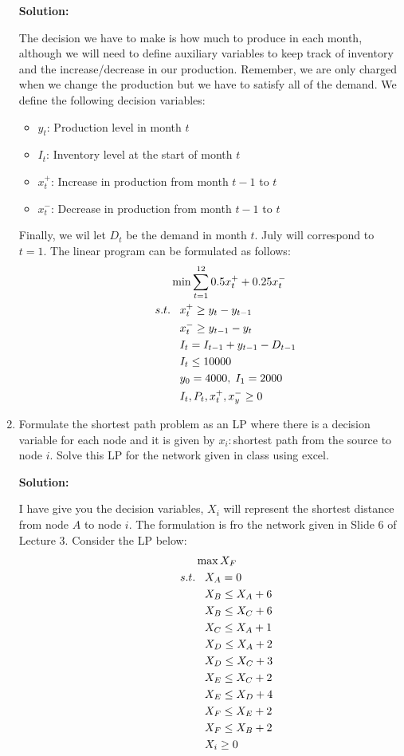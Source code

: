 \documentclass{article}[11 pt]    %
\begin{document}
\begin{enumerate}
\noindent \textbf{Solution:}

The decision we have to make is how much to produce in each month, although we will need to define auxiliary variables to keep track of inventory and the increase/decrease in our production.  Remember, we are only charged when we change the production but we have to satisfy all of the demand. We define the following decision variables:
\begin{itemize}
\item $y_t$: Production level in month $t$
\item $I_t$: Inventory level at the start of month $t$
\item $x^+_t$: Increase in production from month $t-1$ to $t$
\item $x^-_t$: Decrease in production from month $t-1$ to $t$ 
\end{itemize}
Finally, we wil let $D_t$ be the demand in month $t$. July will correspond to $t=1$.  The linear program can be formulated as follows:
\begin{align*}
\hspace{1.5cm}& \min \sum_{t=1}^{12} 0.5x^+_t + 0.25x^-_t \\
s.t. &\;\;\; x^+_t \geq y_t - y _{t-1}  \\
&\;\;\; x^-_t \geq y_{t-1} - y _{t}\\
&\;\;\; I_t=I_{t-1} + y_{t-1} - D_{t-1} \\
&\;\;\; I_t\leq 10000 \\
&\;\;\; y_0=4000, \; I_1=2000 \\
&\;\;\; I_t, P_t, x^+_t,x^-_y \geq 0
\end{align*}


\item Formulate the shortest path problem as an LP where there is a decision variable for each node and it is given by $x_i:$shortest path from the source to node $i$.  Solve this LP for the network given in class using excel. 

\noindent \textbf{Solution:}

I have give you the decision variables, $X_i$ will represent the shortest distance from node $A$ to node $i$.  The formulation is fro the network given in Slide 6 of Lecture 3. Consider the LP below:
\begin{align*}
\hspace{1.5cm}& \max X_F \\
s.t. &\;\;\; X_A =0  \\
&\;\;\; X_B \leq X_A +6\\
&\;\;\; X_B \leq X_C +6\\
&\;\;\; X_C \leq X_A +1\\
&\;\;\; X_D \leq X_A +2\\
&\;\;\; X_D \leq X_C +3\\
&\;\;\; X_E \leq X_C +2\\
&\;\;\; X_E \leq X_D +4\\
&\;\;\; X_F \leq X_E +2\\
&\;\;\; X_F \leq X_B +2\\
&\;\;\;X_i \geq 0
\end{align*}



\end{enumerate}
\end{document}
